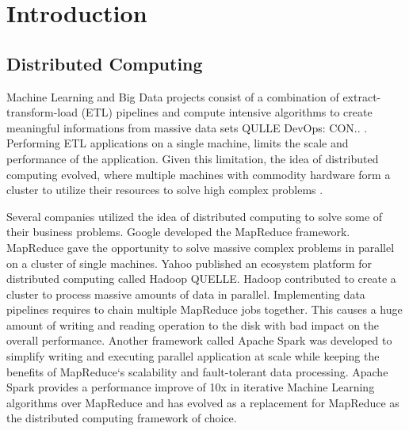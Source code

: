 \chapter{Introduction}
\label{sec:01_introduction}


\section{Distributed Computing}
Machine Learning and Big Data projects consist of a combination of extract-transform-load (ETL) pipelines and compute intensive algorithms to create meaningful informations from massive data sets QULLE DevOps: CON.. .
Performing ETL applications on a single machine, limits the scale and performance of the application. Given this limitation, the idea of distributed computing evolved, where multiple machines with commodity hardware form a cluster to utilize their resources to solve high complex problems \cite{Ganelin2016Spark}.

Several companies utilized the idea of distributed computing to solve some of their business problems. 
Google developed the MapReduce \cite{Dean2004MapReduce} framework. MapReduce gave the opportunity to solve massive complex problems in parallel on a cluster of single machines.
Yahoo published an ecosystem platform for distributed computing called Hadoop QUELLE. Hadoop contributed to create a cluster to process massive amounts of data in parallel.
Implementing data pipelines requires to chain multiple MapReduce jobs together. This causes a huge amount of writing and reading operation to the disk with bad impact on the overall performance. Another framework called Apache Spark was developed to simplify writing and executing parallel application at scale while keeping the benefits of MapReduce`s scalability and fault-tolerant data processing. Apache Spark provides a performance improve of 10x in iterative Machine Learning algorithms over MapReduce \cite{Zaharia2010Spark} and has evolved as a replacement for MapReduce as the distributed computing framework of choice.



